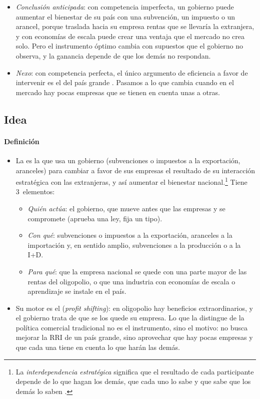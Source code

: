 \documentclass[11pt]{article}
\begin{document}
\begin{itemize}
\item \emph{Conclusión anticipada}: con competencia imperfecta, un gobierno puede aumentar el bienestar de su país con una subvención, un impuesto o un arancel, porque traslada hacia su empresa rentas que se llevaría la extranjera, y con economías de escala puede crear una ventaja que el mercado no crea solo. Pero el instrumento óptimo cambia con supuestos que el gobierno no observa, y la ganancia depende de que los demás no respondan.
\item \emph{Nexo}: con competencia perfecta, el único argumento de eficiencia a favor de intervenir es el del país grande . Pasamos a lo que cambia cuando en el mercado hay pocas empresas que se tienen en cuenta unas a otras.
\end{itemize}

\subsection{Idea}\label{sec:idea}

\paragraph{Definición}

\begin{itemize}
\item La  es la que usa un gobierno (subvenciones o impuestos a la exportación, aranceles) para cambiar a favor de sus empresas el resultado de su interacción estratégica con las extranjeras, y así aumentar el bienestar nacional\nocite{Brander1995Strategic}.\footnote{La \emph{interdependencia estratégica} significa que el resultado de cada participante depende de lo que hagan los demás, que cada uno lo sabe y que sabe que los demás lo saben .} Tiene 3~elementos:
  \begin{itemize}
  \item \emph{Quién actúa}: el gobierno, que mueve antes que las empresas y se compromete (aprueba una ley, fija un tipo).
  \item \emph{Con qué}: subvenciones o impuestos a la exportación, aranceles a la importación y, en sentido amplio, subvenciones a la producción o a la I+D.
  \item \emph{Para qué}: que la empresa nacional se quede con una parte mayor de las rentas del oligopolio, o que una industria con economías de escala o aprendizaje se instale en el país.
  \end{itemize}
\item Su motor es el  (\emph{profit shifting}): en oligopolio hay beneficios extraordinarios, y el gobierno trata de que se los quede su empresa. Lo que la distingue de la política comercial tradicional no es el instrumento, sino el motivo: no busca mejorar la RRI de un país grande, sino aprovechar que hay pocas empresas y que cada una tiene en cuenta lo que harán las demás.
\end{itemize}
\end{document}
